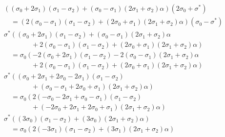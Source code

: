 \begin{displaymath}
    \begin{split}
        &\left(
        (\sigma_0 + 2\sigma_1)(\sigma_1 - \sigma_2)
        + (\sigma_0 - \sigma_1)(2\sigma_1 + \sigma_2)\alpha
        \right)
        (2\sigma_0+\sigma^*)
        \\
        & \quad=
        \left(
        2 (\sigma_0-\sigma_1)(\sigma_1 - \sigma_2)
        + (2\sigma_0 + \sigma_1)(2\sigma_1 + \sigma_2)\alpha
        \right)
        (\sigma_0-\sigma^*)
        \\
        &\sigma^*
        \left(
            (\sigma_0 + 2\sigma_1)(\sigma_1 - \sigma_2)
            + (\sigma_0 - \sigma_1)(2\sigma_1 + \sigma_2)\alpha \right.
            \\ & \left. \quad\quad\quad\quad +
            2 (\sigma_0-\sigma_1)(\sigma_1 - \sigma_2)
            + (2\sigma_0 + \sigma_1)(2\sigma_1 + \sigma_2)\alpha
        \right)
        \\
        & \quad=
        \sigma_0
        \left(
            -2(\sigma_0 + 2\sigma_1)(\sigma_1 - \sigma_2)
            -2(\sigma_0 - \sigma_1)(2\sigma_1 + \sigma_2)\alpha \right.
            \\ & \left. \quad\quad\quad\quad +
            2 (\sigma_0-\sigma_1)(\sigma_1 - \sigma_2)
            + (2\sigma_0 + \sigma_1)(2\sigma_1 + \sigma_2)\alpha
        \right)
        \\
        &\sigma^*
        \left(
            (\sigma_0 + 2\sigma_1 + 2\sigma_0-2\sigma_1)(\sigma_1 - \sigma_2) \right.
            \\ & \left. \quad\quad\quad\quad + (\sigma_0 - \sigma_1 +2\sigma_0 + \sigma_1)(2\sigma_1 + \sigma_2)\alpha
        \right)
        \\
        & \quad=
        \sigma_0
        \left(
            2(-\sigma_0 - 2\sigma_1 +\sigma_0-\sigma_1)(\sigma_1 - \sigma_2) \right.
            \\ & \left. \quad\quad\quad\quad + (-2\sigma_0 +2\sigma_1+2\sigma_0 + \sigma_1)(2\sigma_1 + \sigma_2)\alpha
        \right)
        \\
        &\sigma^*
        \left(
            (3\sigma_0)(\sigma_1 - \sigma_2)
            + (3\sigma_0)(2\sigma_1 + \sigma_2)\alpha
        \right)
        \\
        & \quad =
        \sigma_0
        \left(
            2(- 3\sigma_1)(\sigma_1 - \sigma_2)
            +(3\sigma_1)(2\sigma_1 + \sigma_2)\alpha
        \right)
    \end{split}
\end{displaymath}
